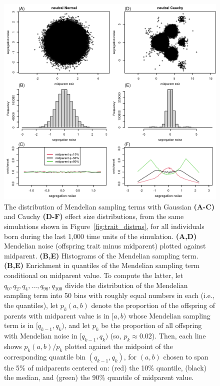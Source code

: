 \documentclass{article}
\newcommand{\1}{\mathbbm{1}}
\theoremstyle{remark}
\theoremstyle{definition}
\begin{document}
\begin{figure}
    \begin{center}
        \includegraphics{sims/neutral_seg_noise}
    \end{center}
    \caption{
        The distribution of Mendelian sampling terms
        with Gaussian \textbf{(A-C)} and Cauchy \textbf{(D-F)} effect size distributions,
        from the same simulations shown in Figure~\ref{fig:trait_distrns},
        for all individuals born during the last 1,000 time units of the simulation.
        \textbf{(A,D)} Mendelian noise (offspring trait minus midparent) plotted against midparent.
        \textbf{(B,E)} Histograms of the Mendelian sampling term.
        \textbf{(B,E)} Enrichment in quantiles of the Mendelian sampling term conditional on midparent value.
        To compute the latter,
        let $q_0, q_2, q_4, \ldots, q_{98}, q_{100}$ divide the distribution of the Mendelian sampling term
        into 50 bins with roughly equal numbers in each (i.e., the quantiles),
        let $p_k(a,b)$ denote the proportion of the offspring of parents with midparent value
        is in $[a, b)$ whose Mendelian sampling term is in $[q_{k-1}, q_k)$,
        and let $p_k$ be the proportion of all offspring with Mendelian noise in $[q_{k-1}, q_k)$
        (so, $p_k \approx 0.02$).
        Then, each line shows $p_k(a,b)/p_k$
        plotted against the midpoint of the corresponding quantile bin $(q_{k-1},q_k)$,
        for $(a,b)$ chosen to span the 5\% of midparents centered on:
        (red) the 10\% quantile,
        (black) the median, and
        (green) the 90\% quantile of midparent value.
        \label{fig:seg_noise}
    }
\end{figure}
\end{document}
